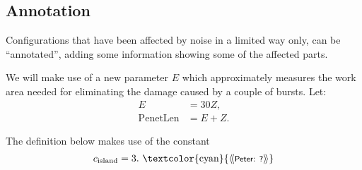 \documentclass[12pt]{memoir}
\newcommand{\authnote}[3]
{\text{{ \textcolor{#3}{\( \langle\hspace{-0.2em}\langle \)\textsf{\footnotesize #1: #2}\( \rangle\hspace{-0.2em}\rangle \)}}}}
\newcommand{\authnote}[2]{}
\newcommand{\Pnote}[1]{{\authnote{Peter}{#1}{cyan}}}
\def\B{B}
\newcommand{\E}{E}
\newcommand{\Noise}{\mathit{Noise}}
\newcommand{\PenetrationLen}{\mathrm{PenetLen}}
\newcommand{\Z}{Z}
\newcommand{\cns}[1]{c_{\textrm{\upshape #1}}}
\begin{document}


\subsection{Annotation}

Configurations that have been affected by noise in a limited way only, can be ``annotated'',
adding some information showing some of the affected parts. 

We will make use of a new parameter \( \E \) which approximately measures the work 
area needed for eliminating the damage caused by a couple of bursts.
Let:
\begin{align}\label{eq:Expansion}
   \E  &= 30\Z, %
\\   \PenetrationLen &= \E+\Z.
 \end{align}

The definition below makes use of the constant
\begin{align*}
   \cns{island}=3. \Pnote{?}
 \end{align*}
\end{document}
